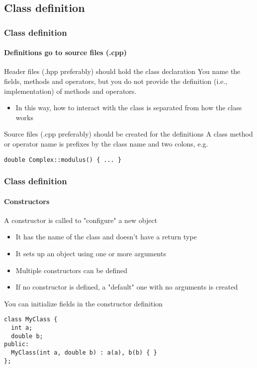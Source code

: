 \subsection{Class definition}

\begin{frame}[fragile]
\frametitle{Class definition}
\framesubtitle{Definitions go to source files (.cpp)}

\begin{block}{Header files (.hpp preferably) should hold the class declaration}
You name the fields, methods and operators, but you do not provide the definition (i.e., implementation) of methods and operators.
\begin{itemize}
\item In this way, how to interact with the class is separated from how the class works
\end{itemize}
\end{block}
\pause
\begin{block}{Source files (.cpp preferably) should be created for the definitions}
A class method or operator name is prefixes by the class name and two colons, e.g.

\begin{verbatim}
double Complex::modulus() { ... }
\end{verbatim}
\end{block}

\end{frame}

\begin{frame}[fragile]
\frametitle{Class definition}
\framesubtitle{Constructors}

\begin{block}{A constructor is called to "configure" a new object}
\begin{itemize}
\item It has the name of the class and doesn't have a return type
\item It sets up an object using one or more arguments
\item Multiple constructors can be defined
\item If no constructor is defined, a "default" one with no arguments is created
\end{itemize}
\end{block}
\pause
\begin{block}{You can initialize fields in the constructor definition}
{\scriptsize
\begin{verbatim}
class MyClass {
  int a;
  double b;
public:
  MyClass(int a, double b) : a(a), b(b) { }
};
\end{verbatim}
}
\end{block}
\end{frame}

